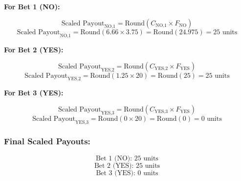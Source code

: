 \documentclass{article}
\begin{document}
\textbf{For Bet 1 (NO):}

\[
\text{Scaled Payout}_{\text{NO,1}} = \text{Round}(C_{\text{NO,1}} \times F_{\text{NO}})
\]
\[
\text{Scaled Payout}_{\text{NO,1}} = \text{Round}(6.66 \times 3.75) = \text{Round}(24.975) = 25 \text{ units}
\]

\textbf{For Bet 2 (YES):}

\[
\text{Scaled Payout}_{\text{YES,2}} = \text{Round}(C_{\text{YES,2}} \times F_{\text{YES}})
\]
\[
\text{Scaled Payout}_{\text{YES,2}} = \text{Round}(1.25 \times 20) = \text{Round}(25) = 25 \text{ units}
\]

\textbf{For Bet 3 (YES):}

\[
\text{Scaled Payout}_{\text{YES,3}} = \text{Round}(C_{\text{YES,3}} \times F_{\text{YES}})
\]
\[
\text{Scaled Payout}_{\text{YES,3}} = \text{Round}(0 \times 20) = \text{Round}(0) = 0 \text{ units}
\]

\subsubsection*{Final Scaled Payouts:}
\[
\text{Bet 1 (NO): } 25 \text{ units}
\]
\[
\text{Bet 2 (YES): } 25 \text{ units}
\]
\[
\text{Bet 3 (YES): } 0 \text{ units}
\]

\begin{center}
\end{center}



\newpage
\end{document}
